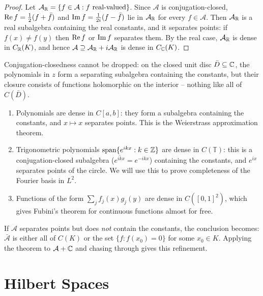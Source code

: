 \documentclass[a4paper]{scrartcl}
\newcommand{\spn}{\operatorname{span}}
\begin{document}
\begin{proof}
	Let $\mathcal{A}_{\mathbb{R}} = \{f \in \mathcal{A} : f \text{ real-valued}\}$. Since $\mathcal A$ is conjugation-closed, $\operatorname{Re} f = \frac12(f + \bar f)$ and $\operatorname{Im} f = \frac{1}{2i}(f-\bar f)$ lie in $\mathcal{A}_{\mathbb{R}}$ for every $f \in \mathcal A$. Then $\mathcal{A}_{\mathbb{R}}$ is a real subalgebra containing the real constants, and it separates points: if $f(x)\neq f(y)$ then $\operatorname{Re} f$ or $\operatorname{Im} f$ separates them. By the real case, $\mathcal{A}_{\mathbb{R}}$ is dense in $C_{\mathbb{R}}(K)$, and hence $\mathcal{A} \supseteq \mathcal{A}_{\mathbb{R}} + i\mathcal{A}_{\mathbb{R}}$ is dense in $C_{\mathbb{C}}(K)$.
\end{proof}

Conjugation-closedness cannot be dropped: on the closed unit disc $\bar D \subseteq \mathbb{C}$, the polynomials in $z$ form a separating subalgebra containing the constants, but their closure consists of functions holomorphic on the interior -- nothing like all of $C(\bar D)$.

\begin{example}
	\begin{enumerate}[label=(\roman*)]
		\item Polynomials are dense in $C[a,b]$: they form a subalgebra containing the constants, and $x \mapsto x$ separates points. This is the Weierstrass approximation theorem.
		\item Trigonometric polynomials $\spn\{e^{ikx} : k \in \Z\}$ are dense in $C(\mathbb{T})$: this is a conjugation-closed subalgebra ($\overline{e^{ikx}} = e^{-ikx}$) containing the constants, and $e^{ix}$ separates points of the circle. We will use this to prove completeness of the Fourier basis in $L^2$.
		\item Functions of the form $\sum_{j} f_j(x)g_j(y)$ are dense in $C([0,1]^2)$, which gives Fubini's theorem for continuous functions almost for free.
	\end{enumerate}
\end{example}

\begin{remark}
	If $\mathcal A$ separates points but does \emph{not} contain the constants, the conclusion becomes: $\bar{\mathcal A}$ is either all of $C(K)$ or the set $\{f : f(x_0)=0\}$ for some $x_0 \in K$. Applying the theorem to $\mathcal{A}+\mathbb{C}$ and chasing through gives this refinement.
\end{remark}

\section{Hilbert Spaces}
\end{document}
